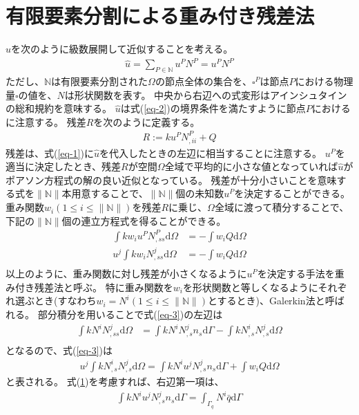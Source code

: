 \documentclass{jarticle}
\begin{document}
\section{有限要素分割による重み付き残差法}
$u$を次のように級数展開して近似することを考える。
\begin{align}
  \hat{u} = \sum_{P\in\mathbb{N}}u^PN^P = u^PN^P\label{eq-shapefunction}
\end{align}
ただし、$\mathbb{N}$は有限要素分割された$\Omega$の節点全体の集合を、$\square^P$は節点$P$における物理量$\square$の値を、$N$は形状関数を表す。
中央から右辺への式変形はアインシュタインの総和規約を意味する。
$\hat{u}$は式(\ref{eq-2})の境界条件を満たすように節点$P$におけるに注意する。
残差$R$を次のように定義する。
\begin{align}
  R:=ku^PN^P_{, ii} + Q
\end{align}
残差は、式(\ref{eq-1})に$\hat{u}$を代入したときの左辺に相当することに注意する。
$u^P$を適当に決定したとき、残差$R$が空間$\Omega$全域で平均的に小さな値となっていれば$\hat{u}$がポアソン方程式の解の良い近似となっている。
残差が十分小さいことを意味する式を$\|\mathbb{N}\|$本用意することで、$\|\mathbb{N}\|$個の未知数$u^P$を決定することができる。
重み関数$w_i(1\leq i\leq\|\mathbb{N}\|)$を残差$R$に乗じ、$\Omega$全域に渡って積分することで、下記の$\|\mathbb{N}\|$個の連立方程式を得ることができる。
\begin{align}
  \int kw_iu^{P}N^P_{, ss}\mathrm{d}\Omega &= -\int w_i Q\mathrm{d}\Omega\\
  u^j\int kw_iN^j_{, ss}\mathrm{d}\Omega &= -\int w_i Q\mathrm{d}\Omega\label{eq-3}\\  
\end{align}
以上のように、重み関数に対し残差が小さくなるように$u^P$を決定する手法を重み付き残差法と呼ぶ。
特に重み関数を$w_i$を形状関数と等しくなるようにそれぞれ選ぶとき(すなわち$w_i = N^i(1\leq i\leq\|\mathbb{N}\|)$とするとき)、Galerkin法と呼ばれる。
部分積分を用いることで式(\ref{eq-3})の左辺は
\begin{align}
  \int kN^iN^j_{, ss}\mathrm{d}\Omega
  &= \int kN^iN^j_{, s}n_s\mathrm{d}\Gamma - \int kN^i_{,s}N^j_{,s}\mathrm{d}\Omega\\ 
\end{align}
となるので、式(\ref{eq-3})は
\begin{align}
　u^j\int kN^i_{,s}N^j_{,s}\mathrm{d}\Omega = \int kN^iu^jN^j_{, s}n_s\mathrm{d}\Gamma + \int w_i Q\mathrm{d}\Omega
\end{align}
と表される。
式(\ref{})を考慮すれば、右辺第一項は、
\begin{align}
  \int kN^iu^jN^j_{, s}n_s\mathrm{d}\Gamma = \int_{\Gamma_q} N^i\bar{q}\mathrm{d}\Gamma
\end{align}
\end{document}
